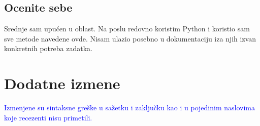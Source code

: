\documentclass[a4paper]{report}
\newcommand{\odgovor}[1]{\textcolor{blue}{#1}}
\begin{document}
\section{Ocenite sebe}
Srednje sam upućen u oblast.
Na poslu redovno koristim Python i koristio sam sve metode navedene ovde. Nisam ulazio posebno u dokumentaciju iza njih izvan konkretnih potreba zadatka.


\chapter{Dodatne izmene}
\odgovor{Izmenjene su sintaksne greške u sažetku i zaključku kao i u pojedinim naslovima koje recezenti nisu primetili.}
\end{document}
